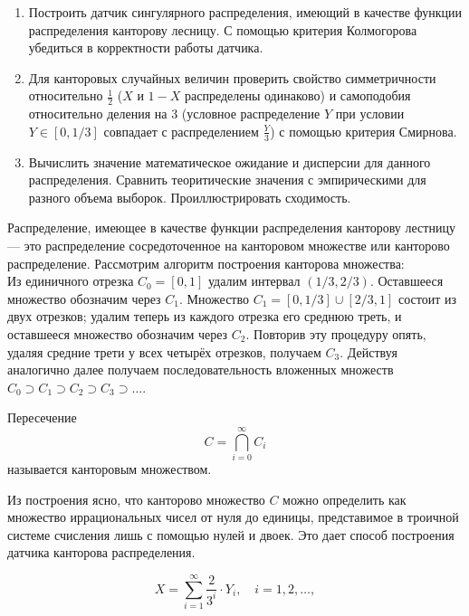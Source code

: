 \begin{enumerate}
	\item Построить датчик сингулярного распределения, имеющий в качестве функции
     распределения канторову лесницу. С помощью критерия Колмогорова убедиться в
     корректности работы датчика.
	\item Для канторовых случайных величин проверить свойство симметричности
     относительно $ \frac{1}{2} $ ($ X $ и $ 1 - X $ распределены одинаково) и
     самоподобия относительно деления на 3 (условное распределение $Y$ при условии
     $ Y \in [0, 1/3] $ совпадает с распределением $ \frac{Y}{3} $) с помощью критерия
     Смирнова.
	\item Вычислить значение математическое ожидание и дисперсии для данного
     распределения. Сравнить теоритические значения с эмпирическими для разного объема
     выборок. Проиллюстрировать сходимость.
\end{enumerate}

Распределение, имеющее в качестве функции распределения канторову лестницу --- это
 распределение сосредоточенное на канторовом множестве или канторово распределение.
 Рассмотрим алгоритм построения канторова множества:\\
 Из единичного отрезка $ C_0=[0,1] $ удалим интервал $ (1/3,2/3) $.
 Оставшееся множество обозначим через $ C_1 $. Множество $ C_1=[0,1/3]\cup[2/3,1] $
 состоит из двух отрезков; удалим теперь из каждого отрезка его среднюю треть, и
 оставшееся множество обозначим через $ C_2 $. Повторив эту процедуру опять, удаляя
 средние трети у всех четырёх отрезков, получаем $ C_3 $. Действуя аналогично далее
 получаем последовательность вложенных множеств
 $ C_0 \supset C_1 \supset C_2 \supset C_3 \supset \dots $.

\begin{definition}
     Пересечение
	\[
	C = \bigcap\limits_{i = 0}^{\infty} C_i
	\]
	называется канторовым множеством.
\end{definition}

Из построения ясно, что канторово множество $ C $ можно определить как множество
 иррациональных чисел от нуля до единицы, представимое в троичной системе счисления
 лишь с помощью нулей и двоек. Это дает способ построения датчика канторова
 распределения.

\begin{equation}\label{cantor_detector}
     X = \displaystyle\sum_{i = 1}^{\infty} \dfrac{2}{3^i} \cdot Y_i, \quad i = 1,2,\dots,
\end{equation}

